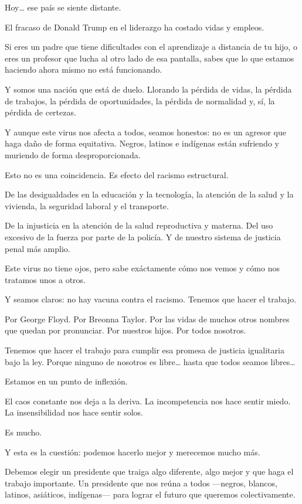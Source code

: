 Hoy\ldots{} ese país se siente distante.

El fracaso de Donald Trump en el liderazgo ha costado vidas y empleos.

Si eres un padre que tiene dificultades con el aprendizaje a distancia
de tu hijo, o eres un profesor que lucha al otro lado de esa pantalla,
sabes que lo que estamos haciendo ahora mismo no está funcionando.

Y somos una nación que está de duelo. Llorando la pérdida de vidas, la
pérdida de trabajos, la pérdida de oportunidades, la pérdida de
normalidad y, sí, la pérdida de certezas.

Y aunque este virus nos afecta a todos, seamos honestos: no es un
agresor que haga daño de forma equitativa. Negros, latinos e indígenas
están sufriendo y muriendo de forma desproporcionada.

Esto no es una coincidencia. Es efecto del racismo estructural.

De las desigualdades en la educación y la tecnología, la atención de la
salud y la vivienda, la seguridad laboral y el transporte.

De la injusticia en la atención de la salud reproductiva y materna. Del
uso excesivo de la fuerza por parte de la policía. Y de nuestro sistema
de justicia penal más amplio.

Este virus no tiene ojos, pero sabe exáctamente cómo nos vemos y cómo
nos tratamos unos a otros.

Y seamos claros: no hay vacuna contra el racismo. Tenemos que hacer el
trabajo.

Por George Floyd. Por Breonna Taylor. Por las vidas de muchos otros
nombres que quedan por pronunciar. Por nuestros hijos. Por todos
nosotros.

Tenemos que hacer el trabajo para cumplir esa promesa de justicia
igualitaria bajo la ley. Porque ninguno de nosotros es libre\ldots{}
hasta que todos seamos libres\ldots{}

Estamos en un punto de inflexión.

El caos constante nos deja a la deriva. La incompetencia nos hace sentir
miedo. La insensibilidad nos hace sentir solos.

Es mucho.

Y esta es la cuestión: podemos hacerlo mejor y merecemos mucho más.

Debemos elegir un presidente que traiga algo diferente, algo mejor y que
haga el trabajo importante. Un presidente que nos reúna a todos
---negros, blancos, latinos, asiáticos, indígenas--- para lograr el
futuro que queremos colectivamente.


